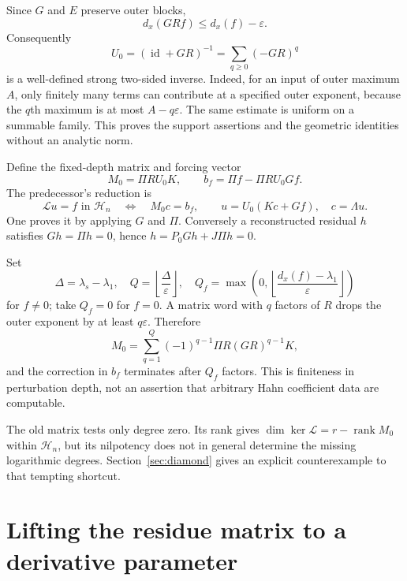 \documentclass[11pt,a4paper]{article}
\numberwithin{equation}{section}
\theoremstyle{definition}
\theoremstyle{remark}
\theoremstyle{definition}
\newcommand{\Hh}{\mathcal H}
\newcommand{\Ll}{\mathcal L}
\newcommand{\rank}{\operatorname{rank}}
\newcommand{\Id}{\operatorname{id}}
\newcommand{\dx}{d_x}
\newcommand{\eps}{\varepsilon}
\begin{document}
Since $G$ and $E$ preserve outer blocks,
\begin{equation}
 \dx(GRf)\le\dx(f)-\eps.
 \label{eq:GRdrop}
\end{equation}
Consequently
\begin{equation}
 U_0=(\Id+GR)^{-1}=\sum_{q\ge0}(-GR)^q
 \label{eq:U0}
\end{equation}
is a well-defined strong two-sided inverse. Indeed, for an input of outer maximum $A$, only finitely many terms can contribute at a specified outer exponent, because the $q$th maximum is at most $A-q\eps$. The same estimate is uniform on a summable family. This proves the support assertions and the geometric identities without an analytic norm.

Define the fixed-depth matrix and forcing vector
\begin{equation}
 M_0=\Pi R U_0K,
 \qquad b_f=\Pi f-\Pi R U_0Gf.
 \label{eq:old-data}
\end{equation}
The predecessor's reduction is
\begin{equation}
 \Ll u=f\text{ in }\Hh_n
 \quad\Longleftrightarrow\quad
 M_0c=b_f,
 \qquad u=U_0(Kc+Gf),\quad c=\Lambda u.
 \label{eq:old-reduction}
\end{equation}
One proves it by applying $G$ and $\Pi$. Conversely a reconstructed residual $h$ satisfies $Gh=\Pi h=0$, hence $h=P_0Gh+J\Pi h=0$.

Set
\begin{equation}
 \Delta=\lambda_s-\lambda_1,\quad
 Q=\left\lfloor\frac{\Delta}{\eps}\right\rfloor,
 \quad Q_f=\max\left(0,\left\lfloor\frac{\dx(f)-\lambda_1}{\eps}\right\rfloor\right)
 \label{eq:cutoffs}
\end{equation}
for $f\ne0$; take $Q_f=0$ for $f=0$. A matrix word with $q$ factors of $R$ drops the outer exponent by at least $q\eps$. Therefore
\begin{equation}
 M_0=\sum_{q=1}^{Q}(-1)^{q-1}\Pi R(GR)^{q-1}K,
 \label{eq:M0-finite}
\end{equation}
and the correction in $b_f$ terminates after $Q_f$ factors. This is finiteness in perturbation depth, not an assertion that arbitrary Hahn coefficient data are computable.

The old matrix tests only degree zero. Its rank gives $\dim\ker\Ll=r-\rank M_0$ within $\Hh_n$, but its nilpotency does not in general determine the missing logarithmic degrees. Section~\ref{sec:diamond} gives an explicit counterexample to that tempting shortcut.

\section{Lifting the residue matrix to a derivative parameter}
\label{sec:lift}
\end{document}
